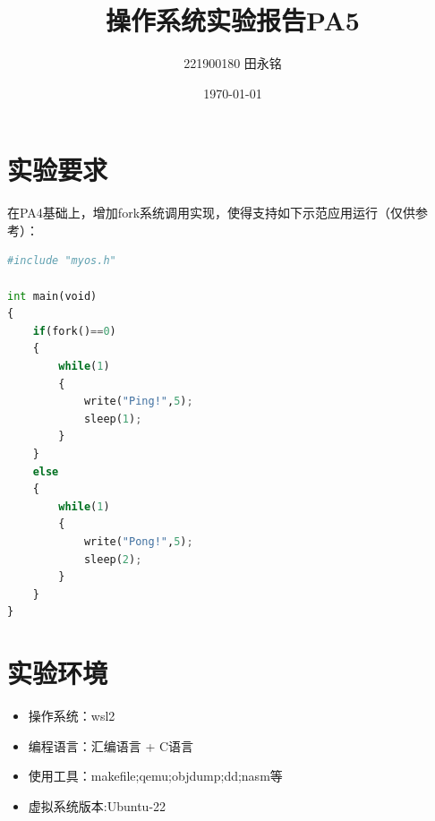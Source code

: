 \documentclass{LabReport}
\title{操作系统实验报告PA5}
\author{221900180 田永铭}
\date{\today}
\begin{document}
	\maketitle
	
	\tableofcontents
	
	\newpage
	
	\section{实验要求}
在PA4基础上，增加fork系统调用实现，使得支持如下示范应用运行（仅供参考）：

\begin{lstlisting}[language=python,frame=shadowbox]
#include "myos.h"

int main(void)
{   
	if(fork()==0)
	{
		while(1)
		{
			write("Ping!",5);
			sleep(1);
		}
	}
	else
	{
		while(1)
		{
			write("Pong!",5);
			sleep(2);
		}
	}
}
\end{lstlisting}

	
	\section{实验环境}
	
	\begin{itemize}
		\item 操作系统：wsl2
		\item 编程语言：汇编语言 + C语言
		\item 使用工具：makefile;qemu;objdump;dd;nasm等
		\item 虚拟系统版本:Ubuntu-22
	\end{itemize}
	
\end{document}
